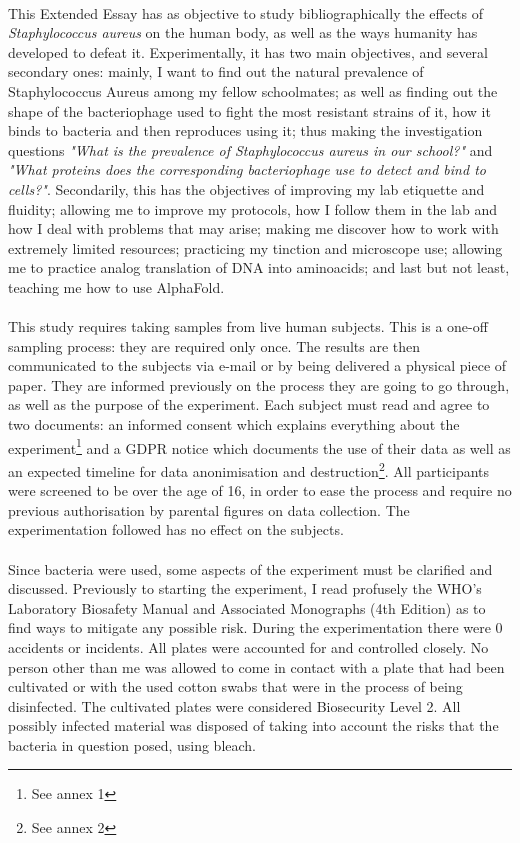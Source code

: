 \paragraph{}This Extended Essay has as objective to study bibliographically the effects of \emph{Staphylococcus aureus} on the human body, as well as the ways humanity has developed to defeat it. Experimentally, it has two main objectives, and several secondary ones: mainly, I want to find out the natural prevalence of Staphylococcus Aureus among my fellow schoolmates; as well as finding out the shape of the bacteriophage used to fight the most resistant strains of it, how it binds to bacteria and then reproduces using it; thus making the investigation questions \emph{"What is the prevalence of \emph{Staphylococcus aureus} in our school?"} and \emph{"What proteins does the corresponding bacteriophage use to detect and bind to cells?"}. Secondarily, this has the objectives of improving my lab etiquette and fluidity; allowing me to improve my protocols, how I follow them in the lab and how I deal with problems that may arise; making me discover how to work with extremely limited resources; practicing my tinction and microscope use; allowing me to practice analog translation of DNA into aminoacids; and last but not least, teaching me how to use AlphaFold.

\paragraph{}This study requires taking samples from live human subjects. This is a one-off sampling process: they are required only once. The results are then communicated to the subjects via e-mail or by being delivered a physical piece of paper. They are informed previously on the process they are going to go through, as well as the purpose of the experiment. Each subject must read and agree to two documents: an informed consent which explains everything about the experiment\footnote{See annex 1} and a GDPR notice which documents the use of their data as well as an expected timeline for data anonimisation and destruction\footnote{See annex 2}. All participants were screened to be over the age of 16, in order to ease the process and require no previous authorisation by parental figures on data collection. The experimentation followed has no effect on the subjects.
\paragraph{}Since bacteria were used, some aspects of the experiment must be clarified and discussed. Previously to starting the experiment, I read profusely the WHO's Laboratory Biosafety Manual and Associated Monographs (4th Edition)\cite{worldhealthorganizationLaboratoryBiosafetyManual2020} as to find ways to mitigate any possible risk. During the experimentation there were 0 accidents or incidents. All plates were accounted for and controlled closely. No person other than me was allowed to come in contact with a plate that had been cultivated or with the used cotton swabs that were in the process of being disinfected. The cultivated plates were considered Biosecurity Level 2. All possibly infected material was disposed of taking into account the risks that the bacteria in question posed, using bleach.
